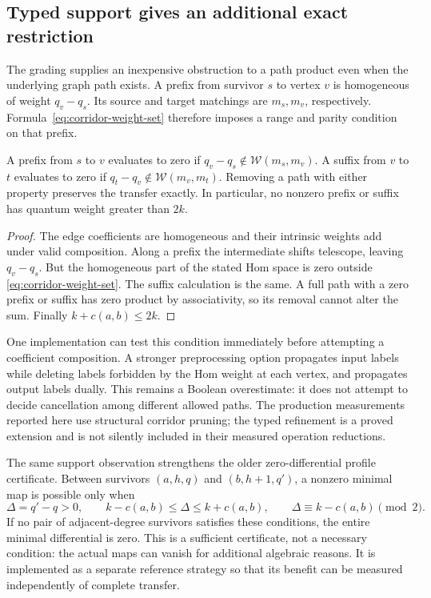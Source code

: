 \subsection{Typed support gives an additional exact restriction}

The grading supplies an inexpensive obstruction to a path product even when
the underlying graph path exists.  A prefix from survivor $s$ to vertex $v$
is homogeneous of weight $q_v-q_s$.  Its source and target matchings are
$m_s,m_v$, respectively.  Formula~\eqref{eq:corridor-weight-set} therefore
imposes a range and parity condition on that prefix.

\begin{proposition}
\label{prop:corridor-typed}
A prefix from $s$ to $v$ evaluates to zero if
$q_v-q_s\notin\mathcal W(m_s,m_v)$.  A suffix from $v$ to $t$ evaluates to
zero if $q_t-q_v\notin\mathcal W(m_v,m_t)$.  Removing a path with either
property preserves the transfer exactly.  In particular, no nonzero prefix
or suffix has quantum weight greater than $2k$.
\end{proposition}
\begin{proof}
The edge coefficients are homogeneous and their intrinsic weights add under
valid composition.  Along a prefix the intermediate shifts telescope, leaving
$q_v-q_s$.  But the homogeneous part of the stated Hom space is zero outside
\eqref{eq:corridor-weight-set}.  The suffix calculation is the same.  A full
path with a zero prefix or suffix has zero product by associativity, so its
removal cannot alter the sum.  Finally $k+c(a,b)\le2k$.
\end{proof}

One implementation can test this condition immediately before attempting a
coefficient composition.  A stronger preprocessing option propagates input
labels while deleting labels forbidden by the Hom weight at each vertex,
and propagates output labels dually.  This remains a Boolean overestimate:
it does not attempt to decide cancellation among different allowed paths.
The production measurements reported here use structural corridor pruning;
the typed refinement is a proved extension and is not silently included in
their measured operation reductions.

The same support observation strengthens the older zero-differential profile
certificate.  Between survivors $(a,h,q)$ and $(b,h+1,q')$, a nonzero minimal
map is possible only when
\begin{equation}\label{eq:corridor-survivor-admissibility}
 \Delta=q'-q>0,\qquad
 k-c(a,b)\le\Delta\le k+c(a,b),\qquad
 \Delta\equiv k-c(a,b)\pmod 2.
\end{equation}
If no pair of adjacent-degree survivors satisfies these conditions, the
entire minimal differential is zero.  This is a sufficient certificate,
not a necessary condition: the actual maps can vanish for additional
algebraic reasons.  It is implemented as a separate reference strategy so
that its benefit can be measured independently of complete transfer.

